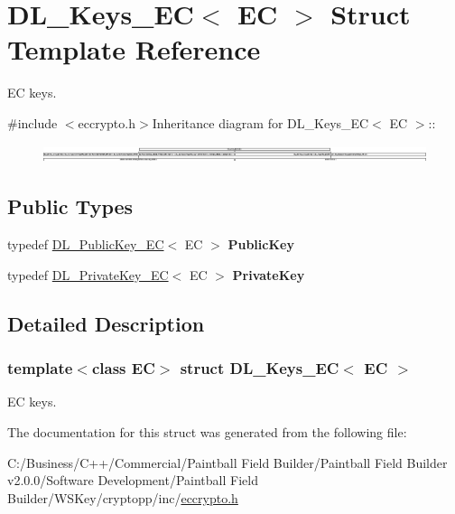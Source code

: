 \hypertarget{struct_d_l___keys___e_c}{
\section{DL\_\-Keys\_\-EC$<$ EC $>$ Struct Template Reference}
\label{struct_d_l___keys___e_c}
}


EC keys.  


{\ttfamily \#include $<$eccrypto.h$>$}Inheritance diagram for DL\_\-Keys\_\-EC$<$ EC $>$::\begin{figure}[H]
\begin{center}
\leavevmode
\includegraphics[height=0.525986cm]{struct_d_l___keys___e_c}
\end{center}
\end{figure}
\subsection*{Public Types}
\begin{DoxyCompactItemize}
\item 
\hypertarget{struct_d_l___keys___e_c_af8913318d514cfd89da1842bc7ce8860}{
typedef \hyperlink{class_d_l___public_key___e_c}{DL\_\-PublicKey\_\-EC}$<$ EC $>$ {\bfseries PublicKey}}
\label{struct_d_l___keys___e_c_af8913318d514cfd89da1842bc7ce8860}

\item 
\hypertarget{struct_d_l___keys___e_c_aa925085adaf95d880795255932b7382f}{
typedef \hyperlink{class_d_l___private_key___e_c}{DL\_\-PrivateKey\_\-EC}$<$ EC $>$ {\bfseries PrivateKey}}
\label{struct_d_l___keys___e_c_aa925085adaf95d880795255932b7382f}

\end{DoxyCompactItemize}


\subsection{Detailed Description}
\subsubsection*{template$<$class EC$>$ struct DL\_\-Keys\_\-EC$<$ EC $>$}

EC keys. 

The documentation for this struct was generated from the following file:\begin{DoxyCompactItemize}
\item 
C:/Business/C++/Commercial/Paintball Field Builder/Paintball Field Builder v2.0.0/Software Development/Paintball Field Builder/WSKey/cryptopp/inc/\hyperlink{eccrypto_8h}{eccrypto.h}\end{DoxyCompactItemize}
